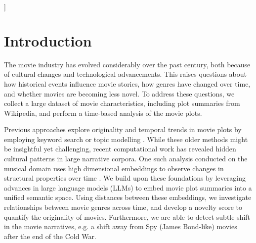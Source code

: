 \documentclass{article}
\begin{document}
\vskip 0.3in
]



\printAffiliationsAndNotice{\icmlEqualContribution} %

\begin{abstract}
Cinema has been a medium for storytelling through visualization, and the evolution of films could tell us about the evolution of culture and societal values. Many sought to quantify this evolution using older natural language methods. We contribute to this ongoing film evolution analysis by scraping and combining multiple sources of data (Wikipedia, IMDB, TMDB) from 1930 to 2024 and embedding the plots with a language model. Using distance distributions, new novelty score and Kolmogorov-Smirnov tests, we show that movie text embeddings are temporally stable with the exception of specific subgenres which demonstrate how movie production changes with respect to cultural and historical contexts.
\end{abstract}

\section{Introduction}\label{sec:intro}

The movie industry has evolved considerably over the past century, both because of cultural changes and technological advancements. This raises questions about how historical events influence movie stories, how genres have changed over time, and whether movies are becoming less novel. To address these questions, we collect a large dataset of movie characteristics, including plot summaries from Wikipedia, and perform a time-based analysis of the movie plots.

Previous approaches explore originality and temporal trends in movie plots by employing keyword search or topic modelling \cite{dubourg2023cinema}. While these older methods might be insightful yet challenging, recent computational work \cite{xu2020cinderella} has revealed hidden cultural patterns in large narrative corpora. One such analysis conducted on the musical domain uses high dimensional embeddings to observe changes in structural properties over time \cite{DiMarco2025}. We build upon these foundations by leveraging advances in large language models (LLMs) to embed movie plot summaries \cite{sreenivasan2013quantitative} into a unified semantic space.
Using distances between these embeddings, we investigate relationships between movie genres across time, and develop a novelty score to quantify the originality of movies. Furthermore, we are able to detect subtle shift in the movie narratives, e.g. a shift away from Spy (James Bond-like) movies after the end of the Cold War.
\end{document}
